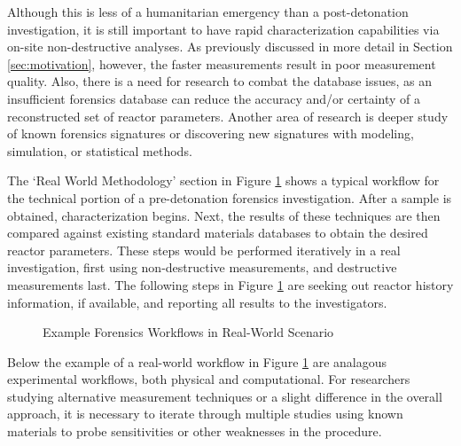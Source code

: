 Although this is less of a humanitarian emergency than a post-detonation
investigation, it is still important to have rapid characterization
capabilities via on-site non-destructive analyses.  As previously discussed in
more detail in Section \ref{sec:motivation}, however, the faster measurements
result in poor measurement quality. Also, there is a need for research to
combat the database issues, as an insufficient forensics database can reduce
the accuracy and/or certainty of a reconstructed set of reactor parameters.
Another area of research is deeper study of known forensics signatures or
discovering new signatures with modeling, simulation, or statistical methods. 

The `Real World Methodology' section in Figure \ref{fig:nfworkflow} shows a
typical workflow for the technical portion of a pre-detonation forensics
investigation.  After a sample is obtained, characterization begins.  Next, the
results of these techniques are then compared against existing standard
materials databases to obtain the desired reactor parameters. These steps would
be performed iteratively in a real investigation, first using non-destructive
measurements, and destructive measurements last.  The following steps in Figure
\ref{fig:nfworkflow} are seeking out reactor history information, if available,
and reporting all results to the investigators. 
\\
\begin{figure}[!h]
  \caption{Example Forensics Workflows in Real-World Scenario}
  \label{fig:nfworkflow}
\end{figure}

Below the example of a real-world workflow in Figure \ref{fig:nfworkflow} are
analagous experimental workflows, both physical and computational.  
For researchers studying
alternative measurement techniques or a slight difference in the overall
approach, it is necessary to iterate through multiple studies using known
materials to probe sensitivities or other weaknesses in the procedure.

